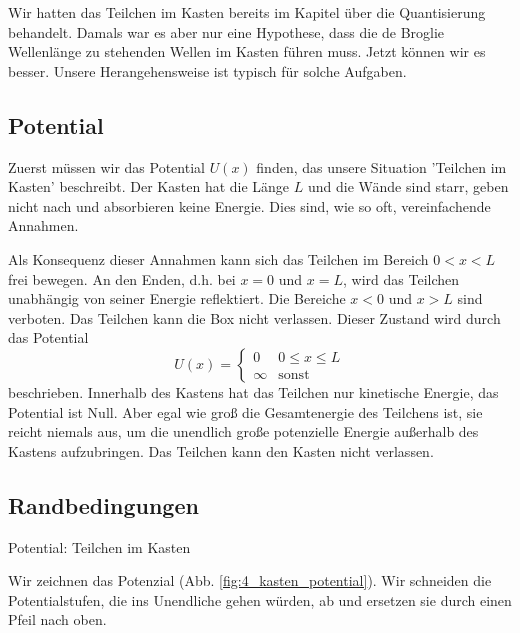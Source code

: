 Wir hatten das Teilchen im Kasten bereits im Kapitel über die Quantisierung behandelt. Damals war es aber nur eine Hypothese, dass die de Broglie Wellenlänge zu stehenden Wellen im Kasten führen muss. Jetzt können wir es besser. Unsere Herangehensweise ist typisch für solche Aufgaben.


\subsection{Potential}

Zuerst müssen wir das Potential $U(x)$ finden, das unsere Situation 'Teilchen im Kasten' beschreibt. Der Kasten hat die Länge $L$ und die Wände sind starr, geben nicht nach und absorbieren keine Energie. Dies sind, wie so oft, vereinfachende Annahmen.

Als Konsequenz dieser Annahmen kann sich das Teilchen im Bereich $0 < x < L$ frei bewegen. An den Enden, d.h. bei $x=0$ und $x=L$, wird das Teilchen unabhängig von seiner Energie reflektiert. Die Bereiche $x<0$ und $x>L$ sind verboten. Das Teilchen kann die Box nicht verlassen. Dieser Zustand wird durch das Potential 
\begin{equation}
    U(x) = \left\{ 
        \begin{matrix}
            0 & 0 \le x \le L \\
            \infty & \text{sonst}
        \end{matrix}
    \right.
\end{equation}
beschrieben. Innerhalb des Kastens hat das Teilchen nur kinetische Energie, das Potential ist Null. Aber egal wie groß die Gesamtenergie des Teilchens ist, sie reicht niemals aus, um die unendlich große potenzielle Energie außerhalb des Kastens aufzubringen. Das Teilchen kann den Kasten nicht verlassen.


\subsection{Randbedingungen}

\begin{marginfigure}
    \caption{Potential: Teilchen im Kasten}
    \label{fig:4_kasten_potential}
\end{marginfigure}

Wir zeichnen das Potenzial (Abb.  \ref{fig:4_kasten_potential}). Wir schneiden die Potentialstufen, die ins Unendliche gehen würden, ab und ersetzen sie durch einen Pfeil nach oben.

